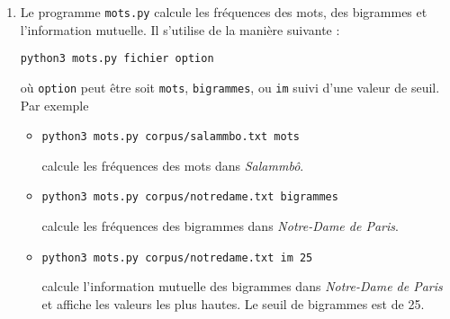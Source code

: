 \documentclass[]{article}
\begin{document}
\begin{enumerate}
\item Le programme \verb=mots.py= calcule les fréquences des mots, des bigrammes et l'information mutuelle. Il s'utilise de la manière suivante :

\begin{verbatim}
python3 mots.py fichier option
\end{verbatim}
où \verb=option= peut être soit \verb=mots=, \verb=bigrammes=, ou \verb=im= suivi d'une valeur de seuil.
Par exemple
\begin{itemize}
\item \begin{verbatim}
python3 mots.py corpus/salammbo.txt mots
\end{verbatim}
calcule les fréquences des mots dans \textit{Salammbô}.

\item \begin{verbatim}
python3 mots.py corpus/notredame.txt bigrammes
\end{verbatim}
calcule les fréquences des bigrammes dans \textit{Notre-Dame de Paris}.

\item \begin{verbatim}
python3 mots.py corpus/notredame.txt im 25
\end{verbatim}
calcule l'information mutuelle des bigrammes dans \textit{Notre-Dame de Paris} et affiche les valeurs les plus hautes. Le seuil de bigrammes est de 25. 
\end{itemize}
\end{enumerate}


\end{document}
